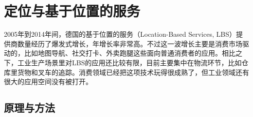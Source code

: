 \section{定位与基于位置的服务}

2005年到2014年间，德国的基于位置的服务（Location-Based Services, LBS）提供商数量经历了爆发式增长，年增长率非常高。不过这一波增长主要是消费市场驱动的，比如地图导航、社交打卡、外卖跑腿这些面向普通消费者的应用。相比之下，工业生产场景里对LBS的应用还比较有限，目前主要集中在物流环节，比如仓库里货物和叉车的追踪。消费领域已经把这项技术玩得很成熟了，但工业领域还有很大的应用空间没有被打开。

\subsection{原理与方法}

